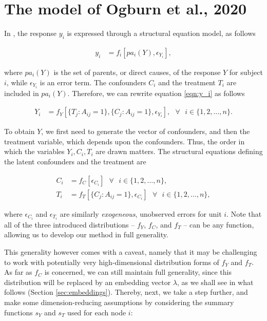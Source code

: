 \documentclass{article}
\begin{document}
\section{The model of Ogburn et al., 2020  \cite{Ogburn:Sofrygin:Diaz:vanderLaan:2017} }
\label{sec:Ogburn}
In \cite{Ogburn2020}, the response $y_i$ is expressed through a structural equation model, as follows

\begin{align}
\label{eqn:y_i}
y_i &= f_i[pa_i(Y), \epsilon_{Y_i}],
\end{align}


\noindent where $pa_i(Y)$ is the set of parents, or direct causes, of the response $Y$ for subject $i$, while $\epsilon_{Y_i}$ is an error term. The confounders $C_i$ and the treatment $T_i$ are included in $pa_i(Y)$. Therefore, we can rewrite equation \ref{eqn:y_i} as follows


\begin{align*}
Y_i &= f_Y[\{ T_j: A_{ij} =1\}, \{C_j: A_{ij} =1 \}, \epsilon_{Y_i}], \mbox{ } \forall \mbox{ } i \in \{1, 2, \hdots, n\}.
\end{align*}


\noindent To obtain $Y$, we first need to generate the vector of confounders, and then the treatment variable, which depends upon the confounders. Thus, the order in which the variables $Y_i, C_i, T_i$ are drawn matters. The structural equations defining the latent confounders and the treatment are 

\begin{align*}
C_i &= f_C[\epsilon_{C_i}] \mbox{ } \forall \mbox{ } i \in \{1, 2, \hdots, n\},\\
T_i &= f_{T}[\{C_j: A_{ij} =1 \}, \epsilon_{C_i}] \mbox{ } \forall \mbox{ } i \in \{1, 2, \hdots, n\},
\end{align*}

\noindent where $\epsilon_{C_i}$ and  $\epsilon_{T_i}$ are similarly \textit{exogeneous}, unobserved errors for unit $i$. Note that all of the three introduced distributions -- $f_Y$, $f_C$, and $f_T$ -- can be any function, allowing us to develop our method in full generality. 

This generality however comes with a caveat, namely that it may be challenging to work with potentially very high-dimensional distribution forms of $f_Y$ and $f_T$. As far as $f_C$ is concerned, we can still maintain full generality, since this distribution will be replaced by an embedding vector $\lambda$, as we shall see in what follows (Section \ref{sec:embeddings}). Thereby, next, we take a step further, and make some dimension-reducing assumptions by considering the summary functions $s_Y$ and $s_T$ used for each node $i$:
\end{document}
